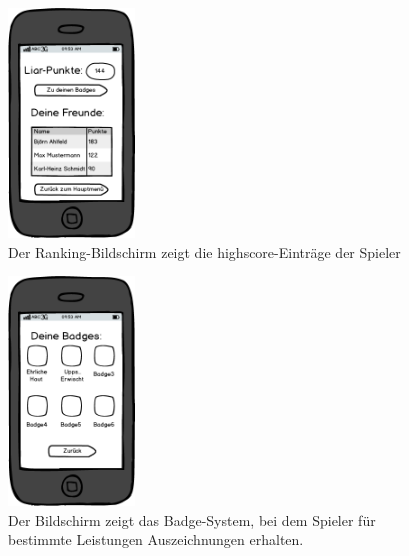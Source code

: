 \documentclass[10pt, a4paper, oneside, titlepage]{scrartcl} %
\begin{document}
	\begin{figure}[ht!]
		\begin{center}
			\includegraphics[width=0.3\textwidth]{mockup_07_ranking.png}
		\end{center}
		\caption[Mockup highscore-Bildschirm]{Der Ranking-Bildschirm zeigt die highscore-Einträge der Spieler}
		\label{fig:mockup_07}
	\end{figure}	
	
	\begin{figure}[ht!]
		\begin{center}
			\includegraphics[width=0.3\textwidth]{mockup_08_badges.png}
		\end{center}
		\caption[Mockup Badge-Bildschirm]{Der Bildschirm zeigt das Badge-System, bei dem Spieler für bestimmte Leistungen Auszeichnungen erhalten.}
		\label{fig:mockup_08}
	\end{figure}	
\end{document}
